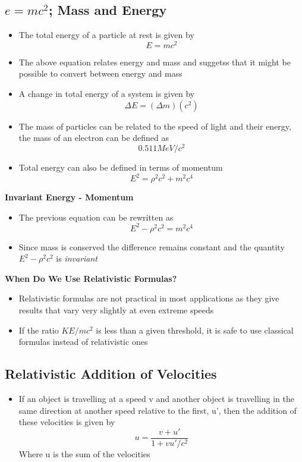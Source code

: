 \subsection{\(e=mc^2\); Mass and Energy}
\begin{itemize}
    \item The total energy of a particle at rest is given by \[E=mc^2\]
    \item The above equation relates energy and mass and suggetss that it might be possible to convert between energy and mass
    \item A change in total energy of a system is given by \[\Delta E=(\Delta m)(c^2)\]
    \item The mass of particles can be related to the speed of light and their energy, the mass of an electron can be defined as \[0.511MeV/c^2\]
    \item Total energy can also be defined in terms of momentum \[E^2=\rho^2c^2+m^2c^4\]
\end{itemize}

\textbf{Invariant Energy - Momentum}
\begin{itemize}
    \item The previous equation can be rewritten as \[E^2-\rho^2c^2=m^2c^4\] 
    \item Since mass is conserved the difference remains constant and the quantity \(E^2-\rho^2c^2\) is \emph{invariant}
\end{itemize}

\textbf{When Do We Use Relativistic Formulas?}
\begin{itemize}
    \item Relativistic formulas are not practical in most applications as they give results that vary very slightly at even extreme speeds
    \item If the ratio \(KE/mc^2\) is less than a given threshold, it is safe to use classical formulas instead of relativistic ones
\end{itemize}

\subsection{Relativistic Addition of Velocities}
\begin{itemize}
    \item If an object is travelling at a speed v and another object is travelling in the same direction at another speed relative to the first, u', then the addition of these velocities is given by \[u=\frac{v+u'}{1+vu'/c^2}\] Where u is the sum of the velocities
\end{itemize}

